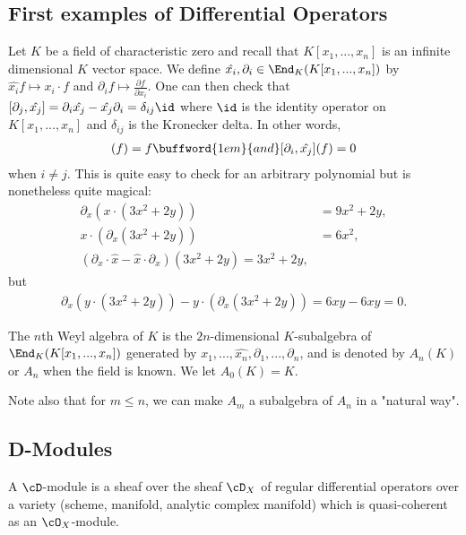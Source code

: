 \subsection{First examples of Differential Operators}
\begin{example}\label{exp:Weyl-algebra}
	Let $K$ be a field of characteristic zero and recall that $K[x_1,...,x_n]$ is an infinite dimensional $K$ vector space. We define $\hat{x_i}, \partial_i \in \End_K(K[x_1,...,x_n])$ by $\hat{x_i} f \mapsto x_i\cdot f$ and $\partial_i f \mapsto \frac{\partial f}{\partial x_i}$. One can then check that $[\partial_j, \hat{x_j}] = \partial_i \hat{x_j} - \hat{x_j}\partial_i = \delta_{ij}\id$ where $\id$ is the identity operator on $K[x_1,...,x_n]$ and $\delta_{ij}$ is the Kronecker delta. In other words,
	\begin{align*}
		[\partial_i,\hat{x_i}](f) = f \buffword{1em}{and} [\partial_i,\hat{x_j}](f) = 0
	\end{align*}
	when $i \neq j$. This is quite easy to check for an arbitrary polynomial but is nonetheless quite magical:
	\begin{align*}
		\partial_x \left(x\cdot (3x^2 + 2y)\right) &= 9x^2 + 2y, \\
		x \cdot \left(\partial_x(3x^2 + 2y)\right) &= 6x^2, \\
		(\partial_x \cdot \hat{x} - \hat{x}\cdot \partial_x)(3x^2 + 2y) = 3x^2 + 2y,
	\end{align*}
	but
	\begin{align*}
		\partial_x \left(y\cdot(3x^2 + 2y)\right) - y\cdot \left(\partial_x(3x^2 + 2y)\right) = 6xy - 6xy = 0.
	\end{align*}
	\begin{defn}\label{def:Weyl-alg}
		The $n$th Weyl algebra of $K$ is the $2n$-dimensional $K$-subalgebra of $\End_K(K[x_1,...,x_n])$ generated by $\hat{x_1},...,\hat{x_n},\partial_1,...,\partial_n$, and is denoted by $A_n(K)$ or $A_n$ when the field is known. We let $A_0(K) = K$.

		Note also that for $m \leq n$, we can make $A_m$ a subalgebra of $A_n$ in a "natural way".
	\end{defn}
\end{example}

\subsection{D-Modules}
\begin{defn}\label{def:D-modules}
	A $\cD$-module is a sheaf over the sheaf $\cD_X$ of regular differential operators over a variety (scheme, manifold, analytic complex manifold) which is quasi-coherent as an $\cO_X$-module.
\end{defn}

